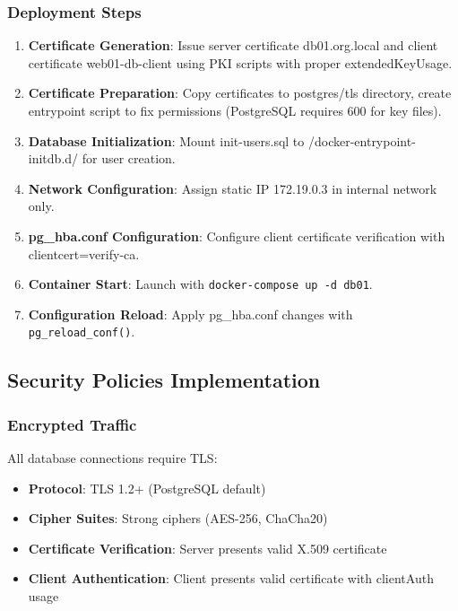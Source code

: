 \subsubsection{Deployment Steps}

\begin{enumerate}
    \item \textbf{Certificate Generation}: Issue server certificate db01.org.local and client certificate web01-db-client using PKI scripts with proper extendedKeyUsage.
    \item \textbf{Certificate Preparation}: Copy certificates to postgres/tls directory, create entrypoint script to fix permissions (PostgreSQL requires 600 for key files).
    \item \textbf{Database Initialization}: Mount init-users.sql to /docker-entrypoint-initdb.d/ for user creation.
    \item \textbf{Network Configuration}: Assign static IP 172.19.0.3 in internal network only.
    \item \textbf{pg\_hba.conf Configuration}: Configure client certificate verification with clientcert=verify-ca.
    \item \textbf{Container Start}: Launch with \texttt{docker-compose up -d db01}.
    \item \textbf{Configuration Reload}: Apply pg\_hba.conf changes with \texttt{pg\_reload\_conf()}.
\end{enumerate}

\subsection{Security Policies Implementation}

\subsubsection{Encrypted Traffic}

All database connections require TLS:
\begin{itemize}
    \item \textbf{Protocol}: TLS 1.2+ (PostgreSQL default)
    \item \textbf{Cipher Suites}: Strong ciphers (AES-256, ChaCha20)
    \item \textbf{Certificate Verification}: Server presents valid X.509 certificate
    \item \textbf{Client Authentication}: Client presents valid certificate with clientAuth usage
\end{itemize}

